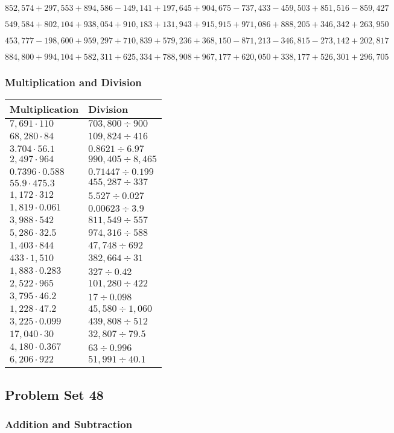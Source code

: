 \(852,574+297,553+894,586-149,141+197,645+904,675-737,433-459,503+851,516-859,427\)

\(549,584+802,104+938,054+910,183+131,943+915,915+971,086+888,205+346,342+263,950\)

\(453,777-198,600+959,297+710,839+579,236+368,150-871,213-346,815-273,142+202,817\)

\(884,800+994,104+582,311+625,334+788,908+967,177+620,050+338,177+526,301+296,705\)

\hypertarget{multiplication-and-division-351}{%
\subsubsection{Multiplication and
Division}\label{multiplication-and-division-351}}

\begin{longtable}[]{@{}ll@{}}
\toprule
Multiplication & Division\tabularnewline
\midrule
\endhead
\(7,691\cdot110\) & \(703,800÷900\)\tabularnewline
\(68,280\cdot84\) & \(109,824÷416\)\tabularnewline
\(3.704\cdot56.1\) & \(0.8621÷6.97\)\tabularnewline
\(2,497\cdot964\) & \(990,405÷8,465\)\tabularnewline
\(0.7396\cdot0.588\) & \(0.71447÷0.199\)\tabularnewline
\(55.9\cdot475.3\) & \(455,287÷337\)\tabularnewline
\(1,172\cdot312\) & \(5.527÷0.027\)\tabularnewline
\(1,819\cdot0.061\) & \(0.00623÷3.9\)\tabularnewline
\(3,988\cdot542\) & \(811,549÷557\)\tabularnewline
\(5,286\cdot32.5\) & \(974,316÷588\)\tabularnewline
\(1,403\cdot844\) & \(47,748÷692\)\tabularnewline
\(433\cdot1,510\) & \(382,664÷31\)\tabularnewline
\(1,883\cdot0.283\) & \(327÷0.42\)\tabularnewline
\(2,522\cdot965\) & \(101,280÷422\)\tabularnewline
\(3,795\cdot46.2\) & \(17÷0.098\)\tabularnewline
\(1,228\cdot47.2\) & \(45,580÷1,060\)\tabularnewline
\(3,225\cdot0.099\) & \(439,808÷512\)\tabularnewline
\(17,040\cdot30\) & \(32,807÷79.5\)\tabularnewline
\(4,180\cdot0.367\) & \(63÷0.996\)\tabularnewline
\(6,206\cdot922\) & \(51,991÷40.1\)\tabularnewline
\bottomrule
\end{longtable}

\hypertarget{problem-set-48-4}{%
\subsection{Problem Set 48}\label{problem-set-48-4}}

\hypertarget{addition-and-subtraction-353}{%
\subsubsection{Addition and
Subtraction}\label{addition-and-subtraction-353}}

